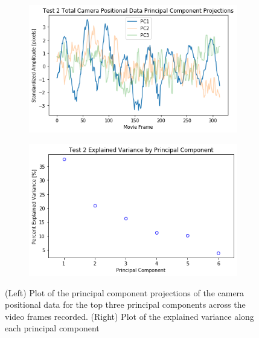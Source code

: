 \documentclass{article}
\begin{document}
\begin{figure}
\centering
   \begin{subfigure}{0.49\linewidth} \centering
     \includegraphics[scale=0.5]{T2_pcDynamics.png}
   \end{subfigure}
   \begin{subfigure}{0.49\linewidth} \centering
     \includegraphics[scale=0.5]{T2_pcExplainedVariance.png}
   \end{subfigure}
\caption{(Left) Plot of the principal component projections of the camera positional data for the top three principal components across the video frames recorded. (Right) Plot of the explained variance along each principal component} \label{fig:test2}
\end{figure}
\end{document}

